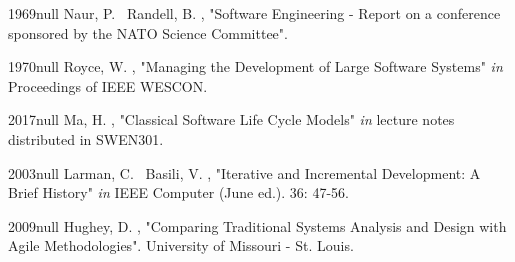 \documentclass{CRPITStyle}
\begin{document}
	
	   

\begin{thebibliography}{xx}

  	{1969}{null}
	Naur, P. \harvardand\ Randell, B.  \harvardyearright , "Software Engineering - Report on a conference sponsored by the NATO Science Committee".
	
	\harvarditem{[Royce]}
	{1970}{null}
	Royce, W. \harvardyearright, "Managing the Development of Large Software Systems" {\em in} Proceedings of IEEE WESCON.

	\harvarditem{[Ma]}
	{2017}{null}
	Ma, H. \harvardyearright, "Classical Software Life Cycle Models" {\em in} lecture notes distributed in SWEN301.
	
	\harvarditem{[Larman]}
	{2003}{null}
	Larman, C. \harvardand\ Basili, V. \harvardyearright, "Iterative and Incremental Development: A Brief History" {\em in} IEEE Computer (June ed.). 36:
	47-56.
	
	\harvarditem{[Hughey]}
	{2009}{null}
	Hughey, D. \harvardyearright, "Comparing Traditional Systems Analysis and Design with Agile Methodologies". University of
	Missouri - St. Louis.

\end{thebibliography}
		
\end{document}
